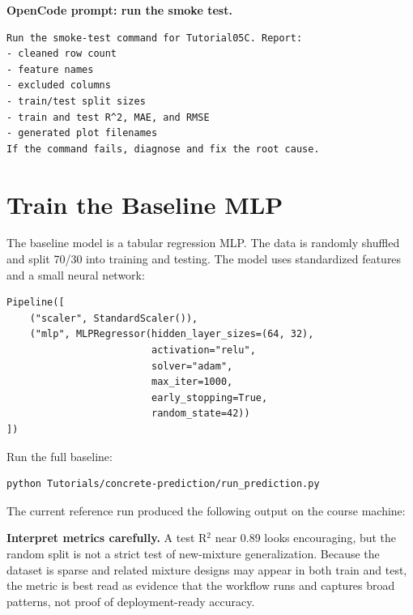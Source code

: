 \documentclass[11pt]{article}
\begin{document}
\begin{ex-box}
\textbf{OpenCode prompt: run the smoke test.}
\begin{lstlisting}[style=term]
Run the smoke-test command for Tutorial05C. Report:
- cleaned row count
- feature names
- excluded columns
- train/test split sizes
- train and test R^2, MAE, and RMSE
- generated plot filenames
If the command fails, diagnose and fix the root cause.
\end{lstlisting}
\end{ex-box}

\section{Train the Baseline MLP}
\label{sec:train-mlp}

The baseline model is a tabular regression MLP.  The data is randomly shuffled and split 70/30 into training and testing.  The model uses standardized features and a small neural network:

\begin{lstlisting}[style=term]
Pipeline([
    ("scaler", StandardScaler()),
    ("mlp", MLPRegressor(hidden_layer_sizes=(64, 32),
                         activation="relu",
                         solver="adam",
                         max_iter=1000,
                         early_stopping=True,
                         random_state=42))
])
\end{lstlisting}

Run the full baseline:

\begin{lstlisting}[style=term]
python Tutorials/concrete-prediction/run_prediction.py
\end{lstlisting}

The current reference run produced the following output on the course machine:



\begin{alert-box}
\textbf{Interpret metrics carefully.}  A test R$^2$ near 0.89 looks encouraging, but the random split is not a strict test of new-mixture generalization.  Because the dataset is sparse and related mixture designs may appear in both train and test, the metric is best read as evidence that the workflow runs and captures broad patterns, not proof of deployment-ready accuracy.
\end{alert-box}
\end{document}
